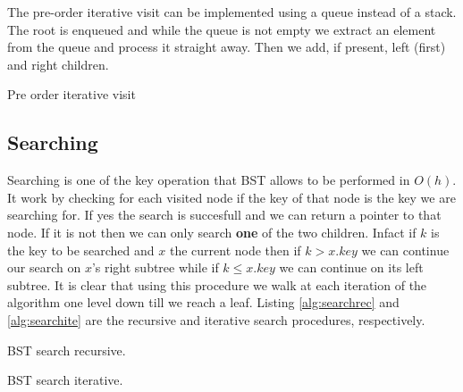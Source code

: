 The pre-order iterative visit can be implemented using a queue instead of a stack. The root is enqueued and while the queue is not empty we extract an element from the queue and process it straight away. Then we add, if present, left (first) and right children.

\begin{algorithm}
\caption{Pre order iterative visit }\label{alg:pre_iter}
\end{algorithm}


\subsection{Searching}
Searching is one of the key operation that BST allows to be performed in $O(h)$. It work by checking for each visited node if the key of that node is the key we are searching for. If yes the search is succesfull and we can return a pointer to that node. If it is not then we can only search \textbf{one} of the two children. Infact if $k$ is the key to be searched and $x$ the current node then if $k > x.key $ we can continue our search on $x$'s right subtree while if $k \leq x.key $ we can continue on its left subtree. It is clear that using this procedure we walk at each iteration of the algorithm one level down till we reach a leaf. Listing \ref{alg:searchrec} and \ref{alg:searchite} are the recursive and iterative search procedures, respectively.

\begin{algorithm}
\caption{BST search recursive.}\label{alg:searchrec}
\end{algorithm}


\begin{algorithm}
\caption{BST search iterative.}\label{alg:searchite}
\end{algorithm}


